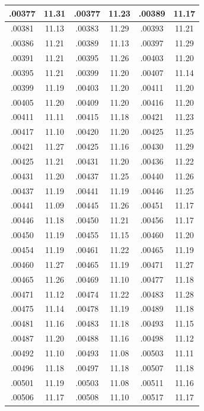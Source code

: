 \documentclass[11pt]{report}
\begin{document}
\begin{appendices}
\begin{longtable}{|c|c||c|c||c|c|}
.00377 & 11.31 & .00377 & 11.23 & .00389 & 11.17\\\hline
.00381 & 11.13 & .00383 & 11.29 & .00393 & 11.21\\\hline
.00386 & 11.21 & .00389 & 11.13 & .00397 & 11.29\\\hline
.00391 & 11.21 & .00395 & 11.26 & .00403 & 11.20\\\hline
.00395 & 11.21 & .00399 & 11.20 & .00407 & 11.14\\\hline
.00399 & 11.19 & .00403 & 11.20 & .00411 & 11.20\\\hline
.00405 & 11.20 & .00409 & 11.20 & .00416 & 11.20\\\hline
.00411 & 11.11 & .00415 & 11.18 & .00421 & 11.23\\\hline
.00417 & 11.10 & .00420 & 11.20 & .00425 & 11.25\\\hline
.00421 & 11.27 & .00425 & 11.16 & .00430 & 11.29\\\hline
.00425 & 11.21 & .00431 & 11.20 & .00436 & 11.22\\\hline
.00431 & 11.20 & .00437 & 11.25 & .00440 & 11.26\\\hline
.00437 & 11.19 & .00441 & 11.19 & .00446 & 11.25\\\hline
.00441 & 11.09 & .00445 & 11.26 & .00451 & 11.17\\\hline
.00446 & 11.18 & .00450 & 11.21 & .00456 & 11.17\\\hline
.00450 & 11.19 & .00455 & 11.15 & .00460 & 11.20\\\hline
.00454 & 11.19 & .00461 & 11.22 & .00465 & 11.19\\\hline
.00460 & 11.27 & .00465 & 11.19 & .00471 & 11.27\\\hline
.00465 & 11.26 & .00469 & 11.10 & .00477 & 11.18\\\hline
.00471 & 11.12 & .00474 & 11.22 & .00483 & 11.28\\\hline
.00475 & 11.14 & .00478 & 11.19 & .00489 & 11.18\\\hline
.00481 & 11.16 & .00483 & 11.18 & .00493 & 11.15\\\hline
.00487 & 11.20 & .00488 & 11.16 & .00498 & 11.12\\\hline
.00492 & 11.10 & .00493 & 11.08 & .00503 & 11.11\\\hline
.00496 & 11.18 & .00497 & 11.18 & .00507 & 11.18\\\hline
.00501 & 11.19 & .00503 & 11.08 & .00511 & 11.16\\\hline
.00506 & 11.17 & .00508 & 11.10 & .00517 & 11.17\\\hline

\end{longtable}
\end{appendices}
\end{document}
